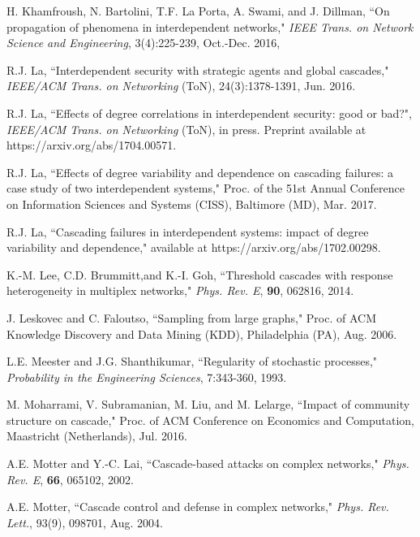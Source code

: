 \documentclass[10pt, journal, compsoc]{IEEEtran}
\begin{document}
\begin{thebibliography}{1}
H. Khamfroush, N. Bartolini, T.F. La Porta, 
A. Swami, and J. Dillman, 
``On propagation of phenomena in interdependent
	networks,"
{\em IEEE Trans. on Network Science and Engineering}, 
3(4):225-239, Oct.-Dec. 2016, 

R.J. La, 
``Interdependent security with strategic agents and global 
cascades," {\em IEEE/ACM Trans. on Networking} (ToN), 
24(3):1378-1391, Jun. 2016.

R.J. La, 
``Effects of degree correlations in interdependent security:
good or bad?", {\em IEEE/ACM Trans. on Networking} (ToN), 
in press. Preprint available at 
https://arxiv.org/abs/1704.00571. 


R.J. La, 
``Effects of degree variability and dependence on 
	cascading failures: a case study of two interdependent
	systems,"
Proc. of the 51st Annual Conference on Information 
	Sciences and Systems (CISS), Baltimore (MD), Mar. 2017.

R.J. La, 
``Cascading failures in interdependent systems: impact of
degree variability and dependence,"
available at https://arxiv.org/abs/1702.00298. 


K.-M. Lee, C.D. Brummitt,and K.-I. Goh, 
``Threshold cascades with response heterogeneity
	in multiplex networks,"
{\em Phys. Rev. E}, {\bf 90}, 062816, 2014. 

J. Leskovec and C. Faloutso, 
``Sampling from large graphs,"
Proc. of ACM Knowledge Discovery and Data Mining (KDD), 
Philadelphia (PA), Aug. 2006. 

L.E. Meester and J.G. Shanthikumar,
``Regularity of stochastic processes,"
{\em Probability in the Engineering Sciences}, 
7:343-360, 1993. 

M. Moharrami, V. Subramanian, M. Liu, and M. Lelarge,
``Impact of community structure on cascade,"
Proc. of ACM Conference on Economics and Computation, 
Maastricht (Netherlands), Jul. 2016. 


A.E. Motter and Y.-C. Lai, 
``Cascade-based attacks on complex networks,"
{\em Phys. Rev. E}, {\bf 66}, 065102, 2002. 

A.E. Motter, 
``Cascade control and defense in complex networks,"
{\em Phys. Rev. Lett.}, 93(9), 098701, Aug. 2004. 


\end{thebibliography}
\end{document}

